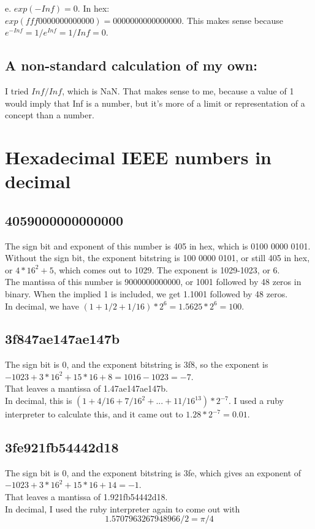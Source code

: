 \documentclass[11pt]{modart}
\begin{document}
e. $exp(-Inf) = 0$.  In hex:\\
$exp(fff0000000000000) = 0000000000000000$.  This makes sense because $e^{-Inf} = 1/e^{Inf} = 1/Inf = 0$.

\subsection{A non-standard calculation of my own:}
I tried $Inf/Inf$, which is NaN.  That makes sense to me, because a value of 1 would imply that Inf is a number, but it's more of a limit or representation of a concept than a number.

\section{Hexadecimal IEEE numbers in decimal}
\subsection{4059000000000000}
The sign bit and exponent of this number is 405 in hex, which is 0100 0000 0101.  Without the sign bit, the exponent bitstring is 100 0000 0101, or still 405 in hex, or $4*16^2 + 5$, which comes out to 1029.  The exponent is 1029-1023, or 6.\\
The mantissa of this number is 9000000000000, or 1001 followed by 48 zeros in binary.  When the implied 1 is included, we get 1.1001 followed by 48 zeros.\\
In decimal, we have $(1 + 1/2 + 1/16) * 2^6=1.5625*2^6=100$.
\subsection{3f847ae147ae147b}
The sign bit is 0, and the exponent bitstring is 3f8, so the exponent is $-1023 + 3*16^2 + 15*16 + 8=1016-1023 = -7$.\\
That leaves a mantissa of 1.47ae147ae147b. \\
In decimal, this is $(1 + 4/16 + 7/16^2 + ... + 11/16^{13})*2^{-7}$.  I used a ruby interpreter to calculate this,
and it came out to $1.28*2^{-7} = 0.01$.
\subsection{3fe921fb54442d18}
The sign bit is 0, and the exponent bitstring is 3fe, which gives an exponent of $-1023 + 3*16^2 + 15*16 + 14 = -1$.\\
That leaves a mantissa of 1.921fb54442d18.\\
In decimal, I used the ruby interpreter again to come out with $$1.5707963267948966/2=\pi/4$$
\end{document}
